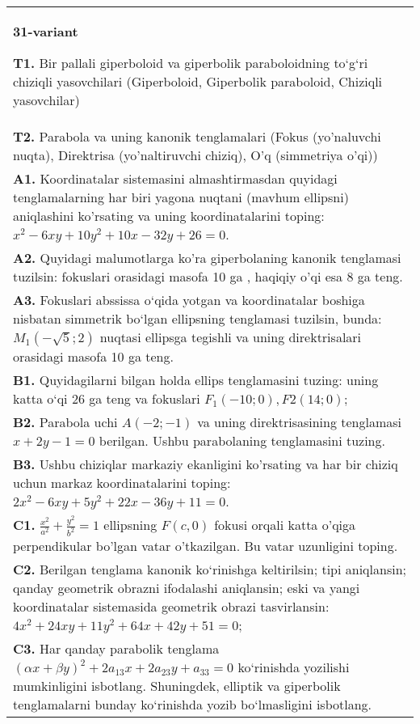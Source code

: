 \documentclass{article}
\begin{document}
\begin{tabular}{m{17cm}}
\textbf{31-variant}
\newline

\textbf{T1.} Bir pallali giperboloid va giperbolik paraboloidning to‘g‘ri chiziqli yasovchilari (Giperboloid, Giperbolik paraboloid, Chiziqli yasovchilar) \\
\textbf{T2.} Parabola va uning kanonik tenglamalari (Fokus (yo’naluvchi nuqta), Direktrisa (yo’naltiruvchi chiziq), O’q (simmetriya o’qi)) \\
\textbf{A1.} Koordinatalar sistemasini almashtirmasdan quyidagi tenglamalarning har biri yagona nuqtani (mavhum ellipsni) aniqlashini ko'rsating va uning koordinatalarini toping: $x^2-6 x y+10 y^2+10 x-32 y+26=0$. \\
\textbf{A2.} Quyidagi malumotlarga ko'ra giperbolaning kanonik tenglamasi tuzilsin: fokuslari orasidagi masofa 10 ga , haqiqiy o'qi esa 8 ga teng. \\
\textbf{A3.} Fokuslari abssissa o‘qida yotgan va koordinatalar boshiga nisbatan simmetrik bo‘lgan ellipsning tenglamasi tuzilsin, bunda: $M_1 (-\sqrt{5}; 2) $ nuqtasi ellipsga tegishli va uning direktrisalari orasidagi masofa 10 ga teng. \\
\textbf{B1.} Quyidagilarni bilgan holda ellips tenglamasini tuzing: uning katta o‘qi 26 ga teng va fokuslari $F_1 (-10; 0), F2 (14; 0) $; \\
\textbf{B2.} Parabola uchi $A(-2;-1)$ va uning direktrisasining tenglamasi $x+2y-1=0$ berilgan. Ushbu parabolaning tenglamasini tuzing. \\
\textbf{B3.} Ushbu chiziqlar markaziy ekanligini ko'rsating va har bir chiziq uchun markaz koordinatalarini toping: $2 x^2-6 x y+5 y^2+22 x-36 y+11=0$. \\
\textbf{C1.} $\frac{x^2}{a^2}+\frac{y^2}{b^2}=1$ ellipsning $F(c, 0)$ fokusi orqali katta o'qiga perpendikular bo'lgan vatar o'tkazilgan. Bu vatar uzunligini toping. \\
\textbf{C2.} Berilgan tenglama kanonik ko‘rinishga keltirilsin; tipi aniqlansin; qanday geometrik obrazni ifodalashi aniqlansin; eski va yangi koordinatalar sistemasida geometrik obrazi tasvirlansin: $4 x^2+24 x y+11 y^2+64 x+42 y+51=0$; \\
\textbf{C3.} Har qanday parabolik tenglama $ (\alpha x+\beta y) ^2+2a_{13}x+2a_{23}y+a_{33}=0$ ko‘rinishda yozilishi mumkinligini isbotlang. Shuningdek, elliptik va giperbolik tenglamalarni bunday ko‘rinishda yozib bo‘lmasligini isbotlang. \\

\end{tabular}
\vspace{1cm}
\end{document}

